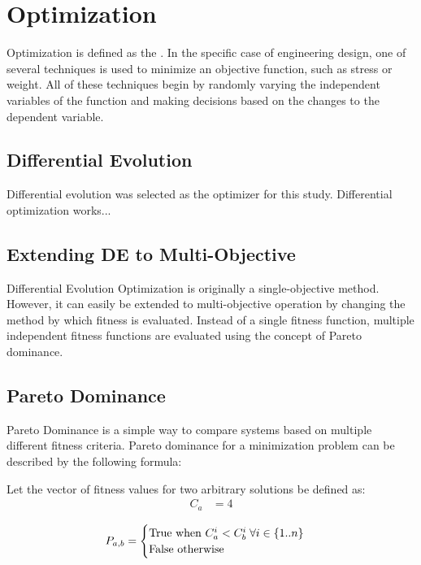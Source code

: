 \section{Optimization}
Optimization is defined as the . In the specific case of engineering design, one of several techniques is used to minimize an objective function, such as stress or weight. All of these techniques begin by randomly varying the independent variables of the function and making decisions based on the changes to the dependent variable. 

\subsection{Differential Evolution}
Differential evolution was selected as the optimizer for this study. Differential optimization works...

\subsection{Extending DE to Multi-Objective}
Differential Evolution Optimization is originally a single-objective method. However, it can easily be extended to multi-objective operation by changing the method by which fitness is evaluated. Instead of a single fitness function, multiple independent fitness functions are evaluated using the concept of Pareto dominance. 

\subsection{Pareto Dominance}
Pareto Dominance is a simple way to compare systems based on multiple different fitness criteria. Pareto dominance for a minimization problem can be described by the following formula: 

Let the vector of fitness values for two arbitrary solutions be defined as:
\begin{align*}
C_a &= 4
\end{align*}

$$
P_{a,b} = \begin{cases}
          \hbox{True  when  } C_{a}^i < C_{b}^i \; \forall i \in \{1..n\}\\ 
          \hbox{False otherwise}
          \end{cases}
$$
